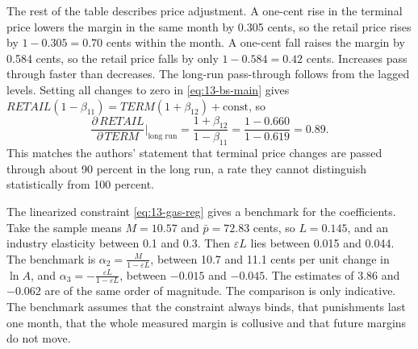 The rest of the table describes price adjustment. A one-cent rise in the terminal price lowers the margin in
the same month by 0.305 cents, so the retail price rises by $1-0.305=0.70$ cents within the month. A one-cent
fall raises the margin by 0.584 cents, so the retail price falls by only $1-0.584=0.42$ cents. Increases pass
through faster than decreases. The long-run pass-through follows from the lagged levels. Setting all changes to
zero in \eqref{eq:13-bs-main} gives $\textit{RETAIL}(1-\beta_{11})=\textit{TERM}(1+\beta_{12})+\text{const}$, so
\begin{equation*}
\frac{\partial\,\textit{RETAIL}}{\partial\,\textit{TERM}}\bigg|_{\text{long run}}=\frac{1+\beta_{12}}{1-\beta_{11}}
=\frac{1-0.660}{1-0.619}=0.89 .
\end{equation*}
This matches the authors' statement that terminal price changes are passed through about 90 percent in the long
run, a rate they cannot distinguish statistically from 100 percent.

\begin{example}\label{ex:13-gas-calibration}
The linearized constraint \eqref{eq:13-gas-reg} gives a benchmark for the coefficients. Take the sample means
$M=10.57$ and $\bar p=72.83$ cents, so $L=0.145$, and an industry elasticity between 0.1 and 0.3. Then
$\varepsilon L$ lies between 0.015 and 0.044. The benchmark is $\alpha_2=\frac{M}{1-\varepsilon L}$, between 10.7
and 11.1 cents per unit change in $\ln A$, and $\alpha_3=-\frac{\varepsilon L}{1-\varepsilon L}$, between $-0.015$
and $-0.045$. The estimates of 3.86 and $-0.062$ are of the same order of magnitude. The comparison is only
indicative. The benchmark assumes that the constraint always binds, that punishments last one month, that the
whole measured margin is collusive and that future margins do not move.
\end{example}

